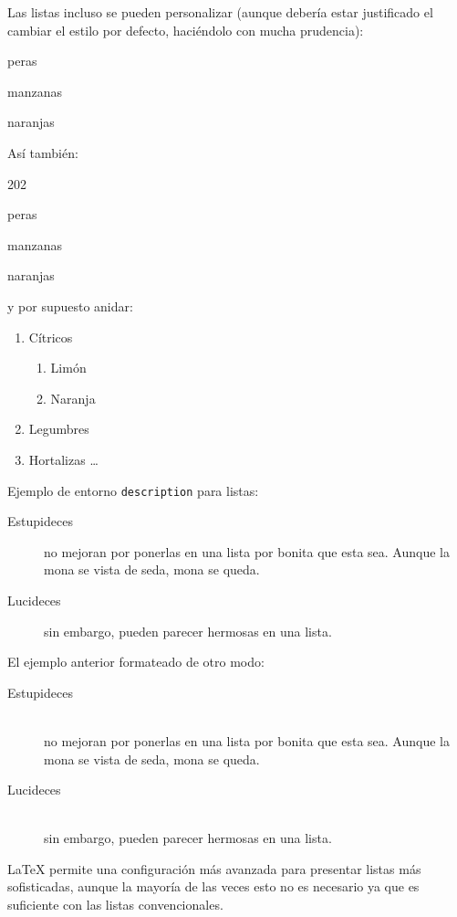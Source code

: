 \documentclass[11pt,a4paper]{article}
\begin{document}
\noindent Las listas incluso se pueden personalizar (aunque debería estar justificado el cambiar el estilo por defecto, haciéndolo con mucha prudencia):

\begin{dinglist}{52} %
	\item peras
	\item manzanas
	\item naranjas
\end{dinglist}


\noindent Así también:

\begin{dingautolist}{202} %
	\item peras
	\item manzanas
	\item naranjas
\end{dingautolist}


\noindent y por supuesto anidar:

\begin{enumerate}
	\item Cítricos
	\begin{enumerate}
		\item Limón
		\item Naranja
	\end{enumerate}
	\item Legumbres
	\item Hortalizas \ldots
\end{enumerate}


\noindent Ejemplo de entorno {\tt description} para listas:

\begin{description}
	\item[Estupideces] no mejoran por ponerlas en una lista por bonita que esta sea. Aunque la mona se vista de seda, mona se queda.
	\item[Lucideces] sin embargo, pueden parecer hermosas en
	una lista.
\end{description}

\noindent El ejemplo anterior formateado de otro modo:

\begin{description}
	\item[Estupideces]\hfill \\ 
	no mejoran por ponerlas en una lista por bonita que esta sea. Aunque la mona se vista de seda, mona se queda.
	\item[Lucideces]\hfill \\ 
	sin embargo, pueden parecer hermosas en una lista.
\end{description}

\LaTeX{} permite una configuración más avanzada para presentar listas más sofisticadas, aunque la mayoría de las veces esto no es necesario ya que es suficiente con las listas convencionales.
\end{document}

